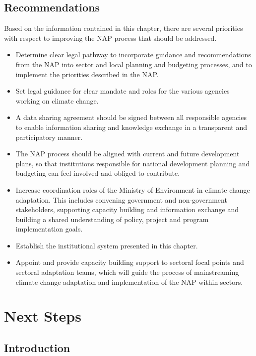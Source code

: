 \documentclass[
]{book}
\begin{document}
\hypertarget{recommendations}{%
\section{Recommendations}\label{recommendations}}

Based on the information contained in this chapter, there are several priorities with respect to improving the NAP process that should be addressed.

\begin{itemize}
\item
  Determine clear legal pathway to incorporate guidance and recommendations from the NAP into sector and local planning and budgeting processes, and to implement the priorities described in the NAP.
\item
  Set legal guidance for clear mandate and roles for the various agencies working on climate change.
\item
  A data sharing agreement should be signed between all responsible agencies to enable information sharing and knowledge exchange in a transparent and participatory manner.
\item
  The NAP process should be aligned with current and future development plans, so that institutions responsible for national development planning and budgeting can feel involved and obliged to contribute.
\item
  Increase coordination roles of the Ministry of Environment in climate change adaptation. This includes convening government and non-government stakeholders, supporting capacity building and information exchange and building a shared understanding of policy, project and program implementation goals.
\item
  Establish the institutional system presented in this chapter.
\item
  Appoint and provide capacity building support to sectoral focal points and sectoral adaptation teams, which will guide the process of mainstreaming climate change adaptation and implementation of the NAP within sectors.
\end{itemize}

\hypertarget{next-steps}{%
\chapter{Next Steps}\label{next-steps}}

\hypertarget{introduction-6}{%
\section{Introduction}\label{introduction-6}}
\end{document}
